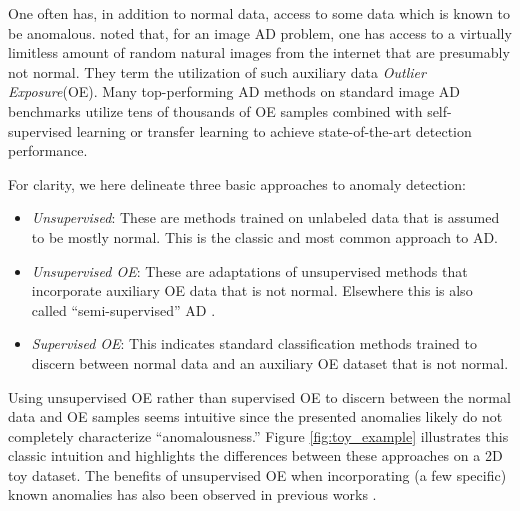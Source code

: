 \documentclass[10pt]{article} \usepackage[accepted]{stylefiles/tmlr}
\begin{document}
One often has, in addition to normal data, access to some data which is known to be anomalous. 
\citet{hendrycks2019deep} noted that, for an image AD problem, one has access to a virtually limitless amount of random natural images from the internet that are presumably not normal. 
They term the utilization of such auxiliary data \emph{Outlier Exposure}\;(OE).
Many top-performing AD methods on standard image AD benchmarks utilize tens of thousands of OE samples combined with self-supervised learning \citep{hendrycks2019using} or transfer learning \citep{reiss2021panda, deecke2021transfer} to achieve state-of-the-art detection performance.

For clarity, we here delineate three basic approaches to anomaly detection:
\begin{itemize}[noitemsep,topsep=-8pt,leftmargin=*]
    \item \emph{Unsupervised}: These are methods trained on unlabeled data that is assumed to be mostly normal. This is the classic and most common approach to AD.
    \item \emph{Unsupervised OE}: These are adaptations of unsupervised methods that incorporate auxiliary OE data that is not normal. Elsewhere this is also called ``semi-supervised'' AD \citep{gornitz2013toward,ruff2020}.
    \item \emph{Supervised OE}: This indicates standard classification methods trained to discern between normal data and an auxiliary OE dataset that is not normal.
\end{itemize}\vspace{0.2em}
Using unsupervised OE rather than supervised OE to discern between the normal data and OE samples seems intuitive since the presented anomalies likely do not completely characterize ``anomalousness.'' 
Figure \ref{fig:toy_example} illustrates this classic intuition and highlights the differences between these approaches on a 2D toy dataset.
The benefits of unsupervised OE when incorporating (a few specific) known anomalies has also been observed in previous works \citep{tax2001,gornitz2013toward,ruff2020}.
\end{document}
